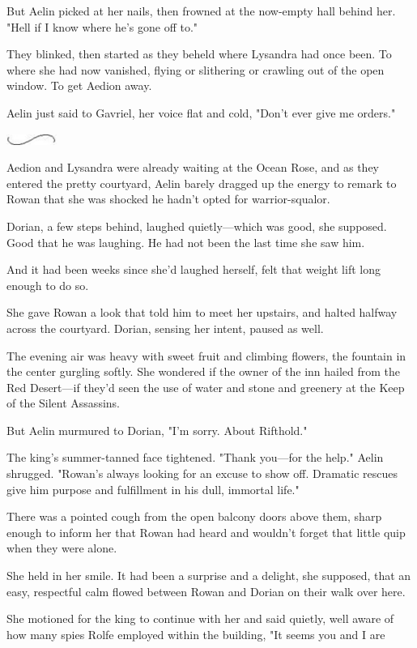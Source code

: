 But Aelin picked at her nails, then frowned at the now-empty hall behind her. "Hell if I know where he's gone off to."

They blinked, then started as they beheld where Lysandra had once been. To where she had now vanished, flying or slithering or crawling out of the open window. To get Aedion away.

Aelin just said to Gavriel, her voice flat and cold, "Don't ever give me orders."

\includegraphics[width=0.65in,height=0.13in]{images/seperator}

Aedion and Lysandra were already waiting at the Ocean Rose, and as they entered the pretty courtyard, Aelin barely dragged up the energy to remark to Rowan that she was shocked he hadn't opted for warrior-squalor.

Dorian, a few steps behind, laughed quietly---which was good, she supposed. Good that he was laughing. He had not been the last time she saw him.

And it had been weeks since she'd laughed herself, felt that weight lift long enough to do so.

She gave Rowan a look that told him to meet her upstairs, and halted halfway across the courtyard. Dorian, sensing her intent, paused as well.

The evening air was heavy with sweet fruit and climbing flowers, the fountain in the center gurgling softly. She wondered if the owner of the inn hailed from the Red Desert---if they'd seen the use of water and stone and greenery at the Keep of the Silent Assassins.

But Aelin murmured to Dorian, "I'm sorry. About Rifthold."

The king's summer-tanned face tightened. "Thank you---for the help." Aelin shrugged. "Rowan's always looking for an excuse to show off. Dramatic rescues give him purpose and fulfillment in his dull, immortal life."

There was a pointed cough from the open balcony doors above them, sharp enough to inform her that Rowan had heard and wouldn't forget that little quip when they were alone.

She held in her smile. It had been a surprise and a delight, she supposed, that an easy, respectful calm flowed between Rowan and Dorian on their walk over here.

She motioned for the king to continue with her and said quietly, well aware of how many spies Rolfe employed within the building, "It seems you and I are

